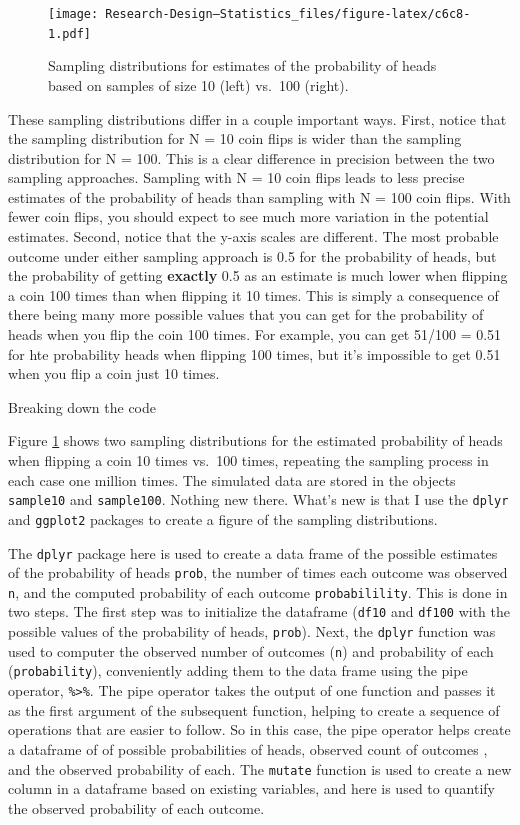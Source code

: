 \documentclass[
]{book}
\begin{document}
\begin{figure}
\centering
\texttt{[image: Research-Design---Statistics\_files/figure-latex/c6c8-1.pdf]}
\caption{\label{fig:c6c8}Sampling distributions for estimates of the probability of heads based on samples of size 10 (left) vs.~100 (right).}
\end{figure}

These sampling distributions differ in a couple important ways. First, notice that the sampling distribution for N = 10 coin flips is wider than the sampling distribution for N = 100. This is a clear difference in precision between the two sampling approaches. Sampling with N = 10 coin flips leads to less precise estimates of the probability of heads than sampling with N = 100 coin flips. With fewer coin flips, you should expect to see much more variation in the potential estimates. Second, notice that the y-axis scales are different. The most probable outcome under either sampling approach is 0.5 for the probability of heads, but the probability of getting \textbf{exactly} 0.5 as an estimate is much lower when flipping a coin 100 times than when flipping it 10 times. This is simply a consequence of there being many more possible values that you can get for the probability of heads when you flip the coin 100 times. For example, you can get 51/100 = 0.51 for hte probability heads when flipping 100 times, but it's impossible to get 0.51 when you flip a coin just 10 times.

Breaking down the code

Figure \ref{fig:c6c8} shows two sampling distributions for the estimated probability of heads when flipping a coin 10 times vs.~100 times, repeating the sampling process in each case one million times. The simulated data are stored in the objects \texttt{sample10} and \texttt{sample100}. Nothing new there. What's new is that I use the \texttt{dplyr} and \texttt{ggplot2} packages to create a figure of the sampling distributions.

The \texttt{dplyr} package here is used to create a data frame of the possible estimates of the probability of heads \texttt{prob}, the number of times each outcome was observed \texttt{n}, and the computed probability of each outcome \texttt{probabilility}. This is done in two steps. The first step was to initialize the dataframe (\texttt{df10} and \texttt{df100} with the possible values of the probability of heads, \texttt{prob}). Next, the \texttt{dplyr} function was used to computer the observed number of outcomes (\texttt{n}) and probability of each (\texttt{probability}), conveniently adding them to the data frame using the pipe operator, \texttt{\%\textgreater{}\%}. The pipe operator takes the output of one function and passes it as the first argument of the subsequent function, helping to create a sequence of operations that are easier to follow. So in this case, the pipe operator helps create a dataframe of of possible probabilities of heads, observed count of outcomes , and the observed probability of each. The \texttt{mutate} function is used to create a new column in a dataframe based on existing variables, and here is used to quantify the observed probability of each outcome.
\end{document}
